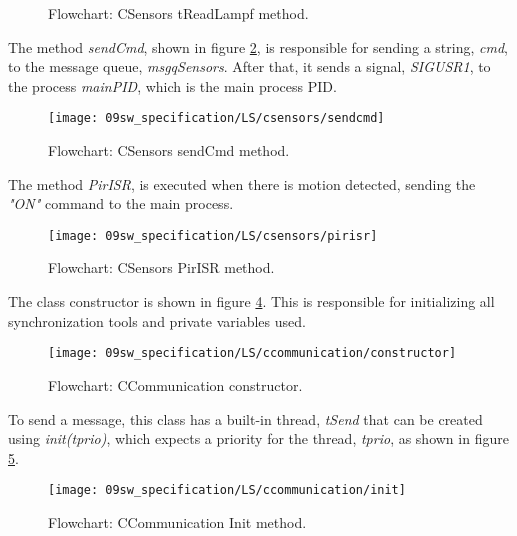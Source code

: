 \begin{figure}[H]
	\centering
	\caption{Flowchart: CSensors tReadLampf method.}
	\label{fig:CSensorstreadlampf}
\end{figure}

The method \textit{sendCmd}, shown in figure \ref{fig:CSensorssendcmd}, is responsible for sending a string, \textit{cmd}, to the message queue, \textit{msgqSensors}. After that, it sends a signal, \textit{SIGUSR1}, to the process \textit{mainPID}, which is the main process PID.

\begin{figure}[H]
	\centering
	\texttt{[image: 09sw\_specification/LS/csensors/sendcmd]}
	\caption{Flowchart: CSensors sendCmd method.}
	\label{fig:CSensorssendcmd}
\end{figure}

The method \textit{PirISR}, is executed when there is motion detected, sending the \textit{"ON"} command to the main process.

\begin{figure}[H]
	\centering
	\texttt{[image: 09sw\_specification/LS/csensors/pirisr]}
	\caption{Flowchart: CSensors PirISR method.}
	\label{fig:CSensorspirisr}
\end{figure}

\clearpage
{}

The class constructor is shown in figure \ref{fig:CCommunicationConstructor}. This is responsible for initializing all synchronization tools and private variables used.

\begin{figure}[H]
	\centering
	\texttt{[image: 09sw\_specification/LS/ccommunication/constructor]}
	\caption{Flowchart: CCommunication constructor.}
	\label{fig:CCommunicationConstructor}
\end{figure}

To send a message, this class has a built-in thread, \textit{tSend} that can be created using \textit{init(tprio)}, which expects a priority for the thread, \textit{tprio}, as shown in figure \ref{fig:CCommunicationinit}.

\begin{figure}[H]
	\centering
	\texttt{[image: 09sw\_specification/LS/ccommunication/init]}
	\caption{Flowchart: CCommunication Init method.}
	\label{fig:CCommunicationinit}
\end{figure}

